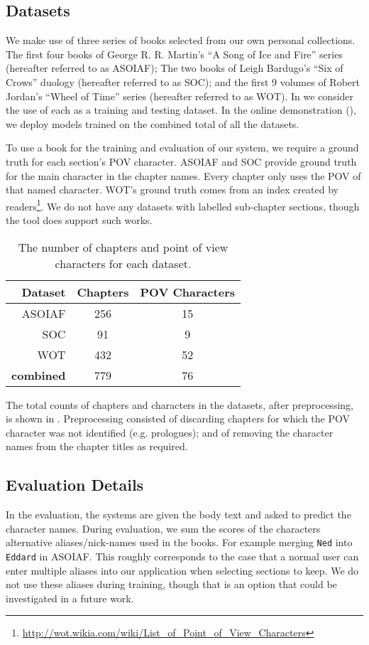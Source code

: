 \documentclass[11pt,a4paper]{article}
\begin{document}
\subsection{Datasets}
We make use of three series of books selected from our own personal collections.
The first four books of George R. R. Martin's ``A Song of Ice and Fire'' series (hereafter referred to as ASOIAF);
The two books of  Leigh Bardugo's ``Six of Crows'' duology (hereafter referred to as SOC);
and the first 9 volumes of Robert Jordan's ``Wheel of Time'' series (hereafter referred to as WOT).
In  we consider the use of each as a training and testing dataset.
In the online demonstration (), we deploy models trained on the combined total of all the datasets.

To use a book for the training and evaluation of our system, we require a ground truth for each section's POV character.
ASOIAF and SOC provide ground truth for the main character in the chapter names.
Every chapter only uses the POV of that named character.
WOT's ground truth comes from an index created by readers\footnote{\url{http://wot.wikia.com/wiki/List_of_Point_of_View_Characters}}.
We do not have any datasets with labelled sub-chapter sections, though the tool does support such works.


\begin{table}
	\begin{tabular}{rcc}
		Dataset & Chapters & POV Characters\\
		\toprule
		ASOIAF  & 256	&	15\\
		SOC		& 91	&	9\\
		WOT     & 432   &   52\\
		\midrule
		\textbf{combined}  &  779 & 76
	\end{tabular}
	\caption{The number of chapters and point of view characters for each dataset. \label{tbl:datasets}}
\end{table}

The total counts of chapters and characters in the datasets, after preprocessing, is shown in .
Preprocessing consisted of  discarding chapters for which the POV character was not identified (e.g. prologues); and of removing the character names from the chapter titles as required.

\subsection{Evaluation Details}
In the evaluation, the systems are given the body text and asked to predict the character names.
During evaluation, we sum the scores of the characters alternative aliases/nick-names used in the  books.
For example merging \texttt{Ned} into \texttt{Eddard} in ASOIAF.
This roughly corresponds to the case that a normal user can enter multiple aliases into our application when selecting sections to keep.
We do not use these aliases during training, though that is an option that could be investigated in a future work.
\end{document}

